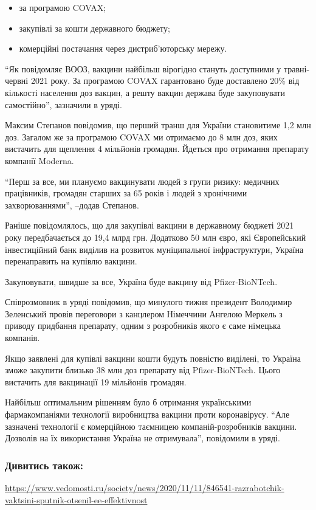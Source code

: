 \begin{itemize}
  \item за програмою COVAX;
  \item закупівлі за кошти державного бюджету;
  \item комерційні постачання через дистриб'юторську мережу.
\end{itemize}

\enquote{Як повідомляє ВООЗ, вакцини найбільш вірогідно стануть доступними у
травні-червні 2021 року. За програмою COVAX гарантовано буде доставлено 20\%
від кількості населення доз вакцин, а решту вакцин держава буде закуповувати
самостійно}, \dshM зазначили в уряді.

Максим Степанов повідомив, що перший транш для України становитиме 1,2 млн доз.
Загалом же за програмою COVAX ми отримаємо до 8 млн доз, яких вистачить для
щеплення 4 мільйонів громадян. Йдеться про отримання препарату компанії
Moderna.

\enquote{Перш за все, ми плануємо вакцинувати людей з групи ризику: медичних працівників, громадян старших за 65 років і людей з хронічними захворюваннями}, –додав Степанов.

Раніше повідомлялось, що для закупівлі вакцини в державному бюджеті 2021 року
передбачається до 19,4 млрд грн. Додатково 50 млн євро, які Європейський
інвестиційний банк виділив на розвиток муніципальної інфраструктури, Україна
перенаправить на купівлю вакцини.

Закуповувати, швидше за все, Україна буде вакцину від Pfizer-BioNTech.

Співрозмовник в уряді повідомив, що минулого тижня президент Володимир
Зеленський провів переговори з канцлером Німеччини Ангелою Меркель з приводу
придбання препарату, одним з розробників якого є саме німецька компанія.

Якщо заявлені для купівлі вакцини кошти будуть повністю виділені, то Україна зможе закупити близько 38 млн доз препарату від Pfizer-BioNTech. Цього вистачить для вакцинації 19 мільйонів громадян.

Найбільш оптимальним рішенням було б отримання українськими фармакомпаніями
технології виробництва вакцини проти коронавірусу. \enquote{Але зазначені технології є
комерційною таємницею компаній-розробників вакцини. Дозволів на їх використання
Україна не отримувала}, \dshM повідомили в уряді.

\subsubsection{Дивитись також:}

\url{https://www.vedomosti.ru/society/news/2020/11/11/846541-razrabotchik-vaktsini-sputnik-otsenil-ee-effektivnost}
